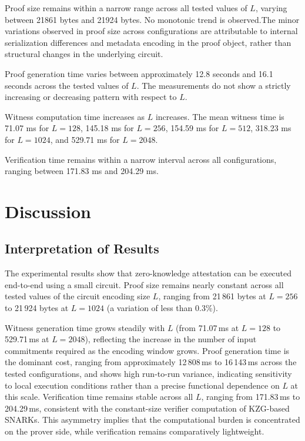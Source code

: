 \documentclass[10pt,conference,a4paper]{IEEEtran}
\begin{document}
Proof size remains within a narrow range across all tested values of $L$, varying between 21861 bytes and 21924 bytes. No monotonic trend is observed.The minor variations observed in proof size across configurations are attributable to internal serialization differences and metadata encoding in the proof object, rather than structural changes in the underlying circuit.

Proof generation time varies between approximately 12.8 seconds and 16.1 seconds across the tested values of $L$. The measurements do not show a strictly increasing or decreasing pattern with respect to $L$.

Witness computation time increases as $L$ increases. The mean witness time is 71.07 ms for $L = 128$, 145.18 ms for $L = 256$, 154.59 ms for $L = 512$, 318.23 ms for $L = 1024$, and 529.71 ms for $L = 2048$.

Verification time remains within a narrow interval across all configurations, ranging between 171.83 ms and 204.29 ms.


\section{Discussion}

\subsection{Interpretation of Results}

The experimental results show that zero-knowledge attestation can be executed end-to-end using a small circuit. Proof size remains nearly constant across all tested values of the circuit encoding size $L$, ranging from 21\,861 bytes at $L = 256$ to 21\,924 bytes at $L = 1024$ (a variation of less than 0.3\%).

Witness generation time grows steadily with $L$ (from 71.07\,ms at $L = 128$ to 529.71\,ms at $L = 2048$), reflecting the increase in the number of input commitments required as the encoding window grows. Proof generation time is the dominant cost, ranging from approximately 12\,808\,ms to 16\,143\,ms across the tested configurations, and shows high run-to-run variance, indicating sensitivity to local execution conditions rather than a precise functional dependence on $L$ at this scale. Verification time remains stable across all $L$, ranging from 171.83\,ms to 204.29\,ms, consistent with the constant-size verifier computation of KZG-based SNARKs. This asymmetry implies that the computational burden is concentrated on the prover side, while verification remains comparatively lightweight.
\end{document}
